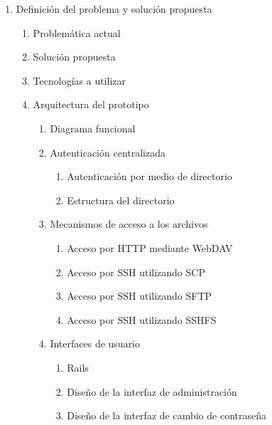 {\begin{enumerate}
\begin{enumerate}
    \begin{enumerate}
      \item Directorio de usuarios
    \end{enumerate}
    \item Protocolo SSH
    \begin{enumerate}
      \item SCP - Secure Copy
      \item SFTP - Secure FTP
      \item SSHFS - Secure Shell Filesystem
    \end{enumerate}
  \end{enumerate}
  \item Definici\'{o}n del problema y soluci\'{o}n propuesta
  \begin{enumerate}
    \item Problem\'{a}tica actual
    \item Soluci\'{o}n propuesta
    \item Tecnolog\'{i}as a utilizar
    \item Arquitectura del prototipo
    \begin{enumerate}
      \item Diagrama funcional
      \item Autenticaci\'{o}n centralizada
      \begin{enumerate}
        \item Autenticaci\'{o}n por medio de directorio
        \item Estructura del directorio
      \end{enumerate}
      \item Mecanismos de acceso a los archivos
      \begin{enumerate}
        \item Acceso por HTTP mediante WebDAV
        \item Acceso por SSH utilizando SCP
        \item Acceso por SSH utilizando SFTP
        \item Acceso por SSH utilizando SSHFS
      \end{enumerate}
      \item Interfaces de usuario
      \begin{enumerate}
        \item Rails
        \item Dise\~{n}o de la interfaz de administraci\'{o}n
        \item Dise\~{n}o de la interfaz de cambio de contrase\~{n}a

\end{enumerate}
\end{enumerate}
\end{enumerate}
\end{enumerate}}
